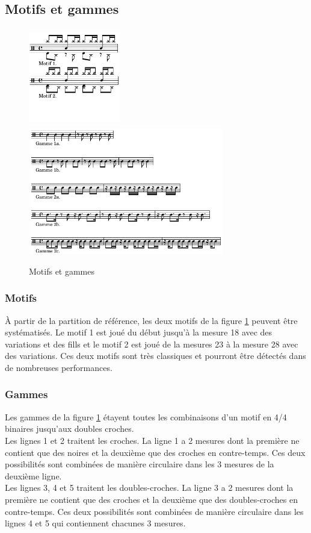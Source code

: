 \subsection*{Motifs et gammes}
\begin{figure}[h]
\centering
\includegraphics[height=43mm, width=40mm]{
z_images/4_experimentations/2_reecriture_guidee/0_motifs_4-4_binaires.png}
\includegraphics[height=55mm, width=85mm]{
z_images/4_experimentations/2_reecriture_guidee/1_gammes_4-4_binaires.png}
\caption{Motifs et gammes}
\label{motifs_gammes}
\end{figure}

\subsubsection{Motifs}
À partir de la partition de référence, les deux motifs de la figure
\ref{motifs_gammes} peuvent être systématisés. Le motif 1 est joué du début
jusqu’à la mesure 18 avec des variations et des fills et le motif 2 est joué de
la mesures 23 à la mesure 28 avec des variations. Ces deux motifs sont très
classiques et pourront être détectés dans de nombreuses performances.\\

\subsubsection{Gammes}
Les gammes de la figure \ref{motifs_gammes} étayent toutes les combinaisons
d’un motif en 4/4 binaires jusqu’aux doubles croches.\\
Les lignes 1 et 2 traitent les croches. La ligne 1 a 2 mesures dont la première
ne contient que des noires et la deuxième que des croches en contre-temps. Ces
deux possibilités sont combinées de manière circulaire dans les 3 mesures de la
deuxième ligne.\\
Les lignes 3, 4 et 5 traitent les doubles-croches. La ligne 3 a 2 mesures dont
la première ne contient que des croches et la deuxième que des doubles-croches
en contre-temps. Ces deux possibilités sont combinées de manière circulaire
dans les lignes 4 et 5 qui contiennent chacunes 3 mesures.

